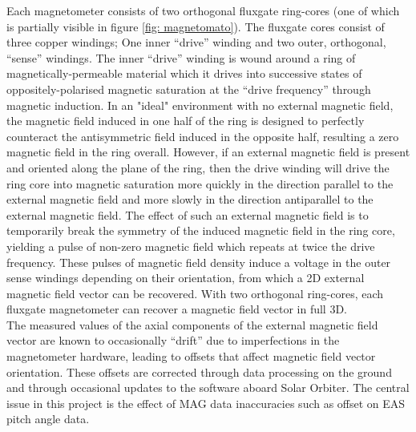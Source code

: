 Each magnetometer consists of two orthogonal fluxgate ring-cores (one of which is partially visible in figure \ref{fig: magnetomato}). The fluxgate cores consist of three copper windings; One inner “drive” winding and two outer, orthogonal, “sense” windings. The inner “drive” winding is wound around a ring of magnetically-permeable material which it drives into successive states of oppositely-polarised magnetic saturation at the “drive frequency” through magnetic induction. In an "ideal" environment with no external magnetic field, the magnetic field induced in one half of the ring is designed to perfectly counteract the antisymmetric field induced in the opposite half, resulting a zero magnetic field in the ring overall. However, if an external magnetic field is present and oriented along the plane of the ring, then the drive winding will drive the ring core into magnetic saturation more quickly in the direction parallel to the external magnetic field and more slowly in the direction antiparallel to the external magnetic field. The effect of such an external magnetic field is to temporarily break the symmetry of the induced magnetic field in the ring core, yielding a pulse of non-zero magnetic field which repeats at twice the drive frequency. These pulses of magnetic field density induce a voltage in the outer sense windings depending on their orientation, from which a 2D external magnetic field vector can be recovered. With two orthogonal ring-cores, each fluxgate magnetometer can recover a magnetic field vector in full 3D\cite{horbury2020}\cite{dickson2024}. 
\\

The measured values of the axial components of the external magnetic field vector are known to occasionally “drift” due to imperfections in the magnetometer hardware, leading to offsets that affect magnetic field vector orientation. These offsets are corrected through data processing on the ground and through occasional updates to the software aboard Solar Orbiter\cite{horbury2020}. The central issue in this project is the effect of MAG data inaccuracies such as offset on EAS pitch angle data. 

